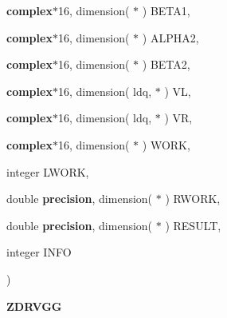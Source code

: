 {\begin{DoxyParamCaption}
\item[{{\bf complex}$\ast$16, dimension( $\ast$ )}]{B\+E\+T\+A1, }
\item[{{\bf complex}$\ast$16, dimension( $\ast$ )}]{A\+L\+P\+H\+A2, }
\item[{{\bf complex}$\ast$16, dimension( $\ast$ )}]{B\+E\+T\+A2, }
\item[{{\bf complex}$\ast$16, dimension( ldq, $\ast$ )}]{V\+L, }
\item[{{\bf complex}$\ast$16, dimension( ldq, $\ast$ )}]{V\+R, }
\item[{{\bf complex}$\ast$16, dimension( $\ast$ )}]{W\+O\+R\+K, }
\item[{integer}]{L\+W\+O\+R\+K, }
\item[{double {\bf precision}, dimension( $\ast$ )}]{R\+W\+O\+R\+K, }
\item[{double {\bf precision}, dimension( $\ast$ )}]{R\+E\+S\+U\+L\+T, }
\item[{integer}]{I\+N\+F\+O}
\end{DoxyParamCaption}
)}\label{group__complex16__eig_ga8f328a5e733c25b59a64e5aceec5bf7f}


{\bfseries Z\+D\+R\+V\+G\+G} 

